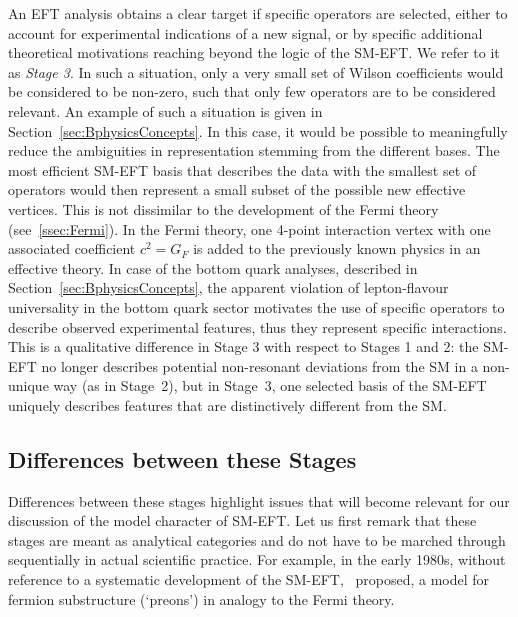 An EFT analysis obtains a clear target if specific operators are selected, either to account for experimental indications of a new signal, or by specific additional theoretical motivations reaching beyond the logic of the SM-EFT. 
We refer to it as \emph{Stage 3}.  
In such a situation, only a very small set of Wilson coefficients would be considered to be non-zero, such that only few operators are to be considered relevant.
An example of such a situation is given in Section~\ref{sec:BphysicsConcepts}.
In this case, it would be possible to meaningfully reduce the
ambiguities in representation stemming from the different bases. 
The most efficient SM-EFT basis that describes the data with the
smallest set of operators would then represent a small subset of the
possible new effective vertices.  
This is not dissimilar to the
development of the Fermi theory (see~\ref{ssec:Fermi}). 
In the Fermi
theory, one 4-point interaction vertex with one associated coefficient
$c^2=G_F$ is added to the previously known physics in an effective
theory. 
In case of the bottom quark analyses, described in Section~\ref{sec:BphysicsConcepts}, the apparent violation of lepton-flavour universality in the bottom quark sector motivates the use of specific operators to describe observed experimental features, thus they represent specific interactions. 
This is a qualitative difference in Stage 3 with respect to Stages 1 and 2: the SM-EFT no longer describes potential non-resonant deviations from the SM in a non-unique way (as in Stage~2), but in Stage~3, one selected basis of the SM-EFT uniquely describes features that are distinctively different from the SM.

\subsection{Differences between these Stages}

Differences between these stages highlight issues that will become
relevant for our discussion of the model character of SM-EFT.
Let us first remark that these stages are meant as analytical categories and do not have to be marched through sequentially in actual scientific practice.
For example, in the early 1980s, without reference to
a systematic development of the SM-EFT,~\cite{Eichten:1983hw} proposed,
a model for fermion substructure (`preons') in analogy to the Fermi theory.


